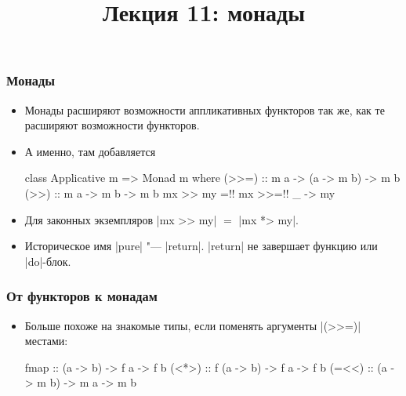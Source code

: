 \documentclass[11pt]{beamer}
\title{Лекция 11: монады}
\begin{document}
\begin{frame}[plain]
  \maketitle
\end{frame}

\begin{frame}[fragile]
  \frametitle{Монады}
  \begin{itemize}
    \item Монады расширяют возможности аппликативных функторов так же, как те расширяют возможности функторов.
    \item А именно, там добавляется
          \begin{haskell}
            class Applicative m => Monad m where
              (>>=) :: m a -> (a -> m b) -> m b
              (>>) :: m a -> m b -> m b
              mx >> my =!\pause! mx >>=!\pause! \_ -> my
          \end{haskell}
          \pause
    \item Для законных экземпляров \haskinline|mx >> my| $=$ \haskinline|mx *> my|.
    \item Историческое имя \haskinline|pure| "--- \haskinline|return|.
          \haskinline|return| не завершает функцию или \haskinline|do|-блок.
  \end{itemize}
\end{frame}

\begin{frame}[fragile]
  \frametitle{От функторов к монадам}
  \begin{itemize}
    \item Больше похоже на знакомые типы, если поменять аргументы \haskinline|(>>=)| местами:
          \begin{haskellsmall}
            fmap  ::   (a -> b) -> f a -> f b
            (<*>) :: f (a -> b) -> f a -> f b
            (=<<) :: (a -> m b) -> m a -> m b
          \end{haskellsmall}
  \end{itemize}
\end{frame}
\end{document}
